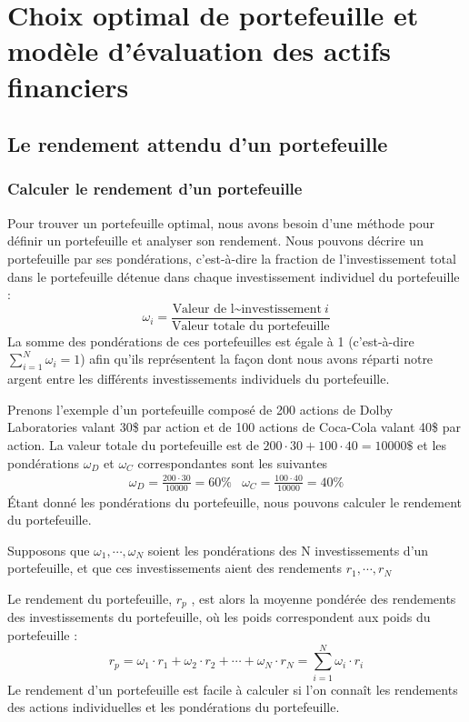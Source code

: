 \documentclass[a4paper, 12pt]{report}
\begin{document}
\chapter{Choix optimal de portefeuille et modèle d'évaluation des actifs financiers}

\section{Le rendement attendu d'un portefeuille}

\subsection{Calculer le rendement d'un portefeuille}
Pour trouver un portefeuille optimal, nous avons besoin d'une méthode pour définir un portefeuille et analyser son rendement. Nous pouvons décrire un portefeuille par ses pondérations, c'est-à-dire la fraction de l'investissement total dans le portefeuille détenue dans chaque investissement individuel du portefeuille :
$$
\omega_i = \frac{\text{Valeur de l\'~investissement}~i }{\text{Valeur totale du portefeuille}}
$$
La somme des pondérations de ces portefeuilles est égale à 1 (c'est-à-dire $\sum_{i=1}^{N}\omega_i=1$) afin qu'ils représentent la façon dont nous avons réparti notre argent entre les différents investissements individuels du portefeuille.

Prenons l'exemple d'un portefeuille composé de 200 actions de Dolby Laboratories valant 30\$ par action et de 100 actions de Coca-Cola valant 40\$ par action. La valeur totale du portefeuille est de $200 \cdot 30 + 100 \cdot 40=10 000\$$ et les pondérations $\omega_D$ et $\omega_C$ correspondantes sont les suivantes 
$$
\begin{matrix}
	\omega_D=\frac{200\cdot30}{10000}=60\% & \omega_C=\frac{100\cdot40}{10000}=40\% 
\end{matrix}
$$
Étant donné les pondérations du portefeuille, nous pouvons calculer le rendement du portefeuille.

Supposons que $\omega_1,\cdots,\omega_N$ soient les pondérations des N investissements d'un portefeuille, et que ces investissements aient des rendements $r_1,\cdots,r_N$

Le rendement du portefeuille, $r_p$ , est alors la moyenne pondérée des rendements des investissements du portefeuille, où les poids correspondent aux poids du portefeuille :
$$
r_p=\omega_1\cdot r_1+\omega_2\cdot r_2+\cdots+\omega_N\cdot r_N=\sum_{i=1}^{N}\omega_i\cdot r_i
$$
Le rendement d'un portefeuille est facile à calculer si l'on connaît les rendements des actions individuelles et les pondérations du portefeuille.
\end{document}
